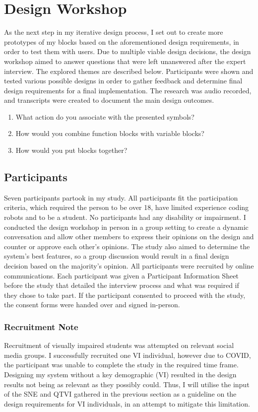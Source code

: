 \documentclass[oneside,%
                    author={Malak Hajji},
                    degree={BSc},
                    title={Designing An Accessible Ozobot Programming Platform for Students},
                  subtitle={With Mixed Visual Abilities}]{dissertation}
\begin{document}
\section{Design Workshop}
\label{workshop}
As the next step in my iterative design process, I set out to create more prototypes of my blocks based on the aforementioned design requirements, in order to test them with users.
Due to multiple viable design decisions, the design workshop aimed to answer questions that were left unanswered after the expert interview. The explored themes are described below. 
Participants were shown and tested various possible designs in order to gather feedback and determine final design requirements for a final implementation. 
The research was audio recorded, and transcripts were created to document the main design outcomes.
\begin{enumerate}
    \item What action do you associate with the presented symbols?
    \item How would you combine function blocks with variable blocks?
    \item How would you put blocks together?
   
    
\end{enumerate}
\subsection{Participants}

Seven participants partook in my study. All participants fit the participation criteria, which required the person to be over 18, have limited experience coding robots and to be a student. No participants had any disability or impairment. I conducted the design workshop in person in a group setting to create a dynamic conversation and allow other members to express their opinions on the design and counter or approve each other's opinions. The study also aimed to determine the system's best features, so a group discussion would result in a final design decision based on the majority's opinion.  
All participants were recruited by online communications. Each participant was given a Participant Information Sheet before the study that detailed the interview process and what was required if they chose to take part. If the participant consented to proceed with the study, the consent forms were handed over and signed in-person.

\subsubsection{Recruitment Note}
Recruitment of visually impaired students was attempted on relevant social media groups. I successfully recruited one VI individual, however due to COVID, the participant was unable to complete the study in the required time frame. Designing my system without a key demographic (VI) resulted in the design results not being as relevant as they possibly could. Thus, I will utilise the input of the SNE and QTVI gathered in the previous section as a guideline on the design requirements for VI individuals, in an attempt to mitigate this limitation.
\end{document}
